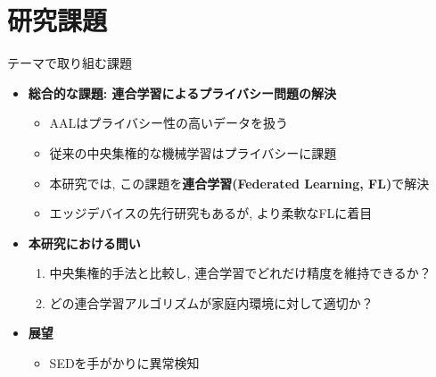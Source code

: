 \documentclass[unicode,12pt,aspectratio=169,dvipdfmx]{beamer}
\begin{document}
\section{研究課題}
\begin{frame}{テーマで取り組む課題}
    \begin{itemize}
        \item \textbf{総合的な課題: 連合学習によるプライバシー問題の解決}
        \begin{itemize}
            \item AALはプライバシー性の高いデータを扱う
            \item 従来の中央集権的な機械学習はプライバシーに課題
            \item 本研究では, この課題を\textbf{連合学習(Federated Learning, FL)}で解決
            \item エッジデバイスの先行研究もあるが, より柔軟なFLに着目
        \end{itemize}
        \item \textbf{本研究における問い}
        \begin{enumerate}
            \item 中央集権的手法と比較し, 連合学習でどれだけ精度を維持できるか？
            \item どの連合学習アルゴリズムが家庭内環境に対して適切か？
        \end{enumerate}
        \item \textbf{展望}
        \begin{itemize}
            \item SEDを手がかりに異常検知
        \end{itemize}
    \end{itemize}
\end{frame}

\end{document}
